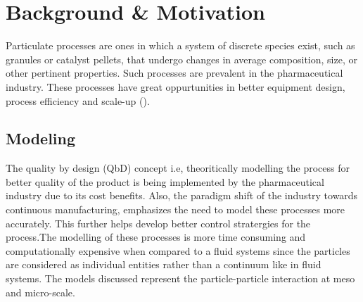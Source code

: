 \documentclass[preprint,11pt,authoryear]{elsarticle}
\begin{document}
	

	\section{Background \& Motivation}
	
	  \par Particulate processes are ones in which a system of discrete species exist, such as granules or catalyst pellets, that undergo changes in average composition, size, or other pertinent properties. Such processes are prevalent in the pharmaceutical industry. These processes have great oppurtunities in better equipment design, process efficiency and scale-up (\cite{Ketterhagen2009}). 
	     
	  
	  \subsection{Modeling}
		\par The quality by design (QbD) concept i.e, theoritically modelling the process for better quality of the product is being implemented by the pharmaceutical industry due to its cost benefits. Also, the paradigm shift of the industry towards continuous manufacturing, emphasizes the need to model these processes more accurately. This further helps develop better control stratergies for the process.The modelling of these processes is more time consuming and computationally expensive when compared to a fluid systems since the particles are considered as individual entities rather than a continuum like in fluid systems. The models discussed represent the particle-particle interaction at meso and micro-scale.	  
\end{document}
